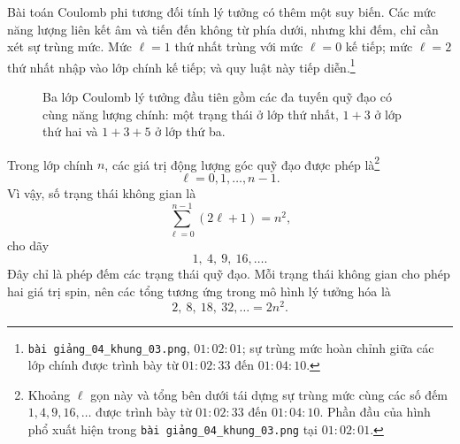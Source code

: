Bài toán Coulomb phi tương đối tính lý tưởng có thêm một suy biến. Các mức năng lượng liên kết âm và tiến đến không từ phía dưới, nhưng khi đếm, chỉ cần xét sự trùng mức. Mức \(\ell=1\) thứ nhất trùng với mức \(\ell=0\) kế tiếp; mức \(\ell=2\) thứ nhất nhập vào lớp chính kế tiếp; và quy luật này tiếp diễn.\footnote{\texttt{bài giảng\_04\_khung\_03.png}, \(01{:}02{:}01\); sự trùng mức hoàn chỉnh giữa các lớp chính được trình bày từ \(01{:}02{:}33\) đến \(01{:}04{:}10\).}

\begin{figure}[htbp]
\centering
{}
\caption{Ba lớp Coulomb lý tưởng đầu tiên gồm các đa tuyến quỹ đạo có cùng năng lượng chính: một trạng thái ở lớp thứ nhất, \(1+3\) ở lớp thứ hai và \(1+3+5\) ở lớp thứ ba.}
\end{figure}

Trong lớp chính \(n\), các giá trị động lượng góc quỹ đạo được phép là\footnote{Khoảng \(\ell\) gọn này và tổng bên dưới tái dựng sự trùng mức cùng các số đếm \(1,4,9,16,\ldots\) được trình bày từ \(01{:}02{:}33\) đến \(01{:}04{:}10\). Phần đầu của hình phổ xuất hiện trong \texttt{bài giảng\_04\_khung\_03.png} tại \(01{:}02{:}01\).}
\[
\ell=0,1,\ldots,n-1.
\]
Vì vậy, số trạng thái không gian là
\begin{equation}
\sum_{\ell=0}^{n-1}(2\ell+1)=n^{2},
\end{equation}
cho dãy
\begin{equation}
1,\ 4,\ 9,\ 16,\ldots .
\end{equation}
Đây chỉ là phép đếm các trạng thái quỹ đạo. Mỗi trạng thái không gian cho phép hai giá trị spin, nên các tổng tương ứng trong mô hình lý tưởng hóa là
\begin{equation}
2,\ 8,\ 18,\ 32,\ldots=2n^{2}.
\end{equation}

